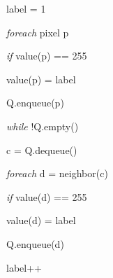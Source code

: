 \begin{easylist}
  \medskip
  \ind label = 1
  
  \ind \textit{foreach} pixel p
  
  \ind \ind \textit{if} value(p) == 255
  
  \ind \ind \ind value(p) = label

  \ind \ind \ind Q.enqueue(p)

  \ind \ind \ind \textit{while} !Q.empty()

  \ind \ind \ind \ind c = Q.dequeue()

  \ind \ind \ind \ind \textit{foreach} d = neighbor(c)

  \ind \ind \ind \ind \ind \textit{if} value(d) == 255

  \ind \ind \ind \ind \ind \ind value(d) = label
  
  \ind \ind \ind \ind \ind \ind Q.enqueue(d)

  \ind \ind \ind label++
  
  \medskip
  
\end{easylist}
